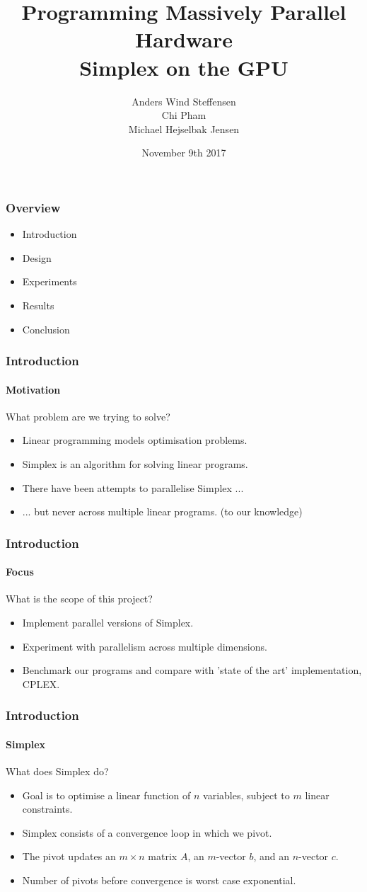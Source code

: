 \documentclass{beamer}
\title{Programming Massively Parallel Hardware\\\textbf{Simplex on the GPU}}
\author[]{%
  Anders Wind Steffensen \\
  Chi Pham \\
  Michael Hejselbak Jensen \\
}
\institute{Department of Computer Science (DIKU)\\University of Copenhagen}
\date[3/3]{November 9th 2017}
\renewcommand{\emph}[1]{\textcolor{structure}{#1}}
\begin{document}
\titleslide


\begin{frame}
  \frametitle{Overview}
  \begin{itemize}
  \item Introduction
  \item Design
  \item Experiments
  \item Results
  \item Conclusion
  \end{itemize}
\end{frame}


\begin{frame}
\frametitle{Introduction}
\framesubtitle{Motivation}
\centering
{\Large What problem are we trying to solve?}

\begin{itemize}
	\item Linear programming models optimisation problems.
	\item Simplex is an algorithm for solving linear programs.
	\item There have been attempts to parallelise Simplex ...
	\pause
	\item ... but never across multiple linear programs. {\tiny (to our knowledge)}
\end{itemize}
\end{frame}

\begin{frame}
\frametitle{Introduction}
\framesubtitle{Focus}
\centering
{\Large What is the scope of this project?}

\begin{itemize}
\item Implement parallel versions of Simplex.
\item Experiment with parallelism across multiple dimensions.
\item Benchmark our programs and compare with 'state of the art' implementation, CPLEX.
\end{itemize}
\end{frame}

\begin{frame}[fragile]
\frametitle{Introduction}
\framesubtitle{Simplex}
\centering
{\Large What does Simplex do?}

\begin{itemize}
\item Goal is to optimise a linear function of $n$ variables, subject to $m$ linear constraints.
\item Simplex consists of a convergence loop in which we \emph{pivot}.
\item The \emph{pivot} updates an $m \times n$ matrix $A$, an $m$-vector $b$, and an $n$-vector $c$.
\item Number of pivots before convergence is worst case exponential.
\end{itemize}
\end{frame}
\end{document}
